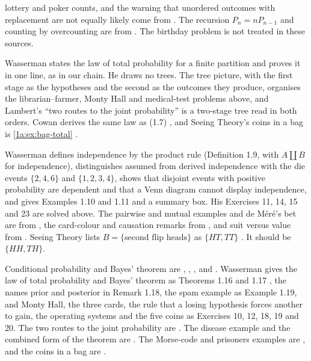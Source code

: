 \begin{description}[leftmargin=1.5em,itemsep=2pt]
lottery and poker counts, and the warning that unordered outcomes with
replacement are not equally likely come from .
The recursion $P_n=nP_{n-1}$ and counting by overcounting are from
. The birthday problem is not treated in these sources.
  \item[Trees.]  Wasserman states the law of total probability for a finite partition and
proves it in one line, as in our chain. He draws no trees. The tree picture,
with the first stage as the hypotheses and the second as the outcomes they
produce, organises the librarian--farmer, Monty Hall and medical-test problems above, and Lambert's ``two routes to the joint probability''
 is a two-stage tree read in both orders. Cowan
derives the same law as (1.7) , and Seeing Theory's
coins in a bag is \cref{1a:ex:bag-total} .
  \item[Independence.]  Wasserman defines independence by the product rule (Definition 1.9, with
$A\amalg B$ for independence), distinguishes assumed from derived independence
with the die events $\{2,4,6\}$ and $\{1,2,3,4\}$, shows that disjoint events with
positive probability are dependent and that a Venn diagram cannot display
independence, and gives Examples 1.10 and 1.11 and a summary box. His
Exercises 11, 14, 15 and 23 are solved above. The pairwise and mutual examples
and de M\'er\'e's bet are from , the card-colour and
causation remarks from , and suit versus value from
. Seeing Theory lists $B=\{\text{second flip heads}\}$ as
$\{HT,TT\}$ . It should be $\{HH,TH\}$.
  \item[Conditioning and Bayes.] Conditional probability and Bayes' theorem are , , ,  and .
Wasserman gives the law of total probability and Bayes' theorem as Theorems 1.16
and 1.17 , the names prior and posterior in Remark 1.18, the
spam example as Example 1.19, and Monty Hall, the three cards, the rule that a
losing hypothesis forces another to gain, the operating systems and the five
coins as Exercises 10, 12, 18, 19 and 20. The two routes to
the joint probability are . The disease example and the
combined form of the theorem are . The
Morse-code and prisoners examples are , and the
coins in a bag are .
\end{description}

